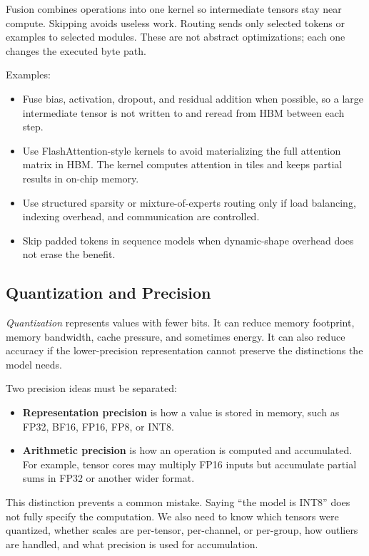 Fusion combines operations into one kernel so intermediate tensors stay near compute. Skipping avoids useless work. Routing sends only selected tokens or examples to selected modules. These are not abstract optimizations; each one changes the executed byte path.

Examples:

\begin{itemize}[leftmargin=*]
  \item Fuse bias, activation, dropout, and residual addition when possible, so a large intermediate tensor is not written to and reread from HBM between each step.
  \item Use FlashAttention-style kernels to avoid materializing the full attention matrix in HBM. The kernel computes attention in tiles and keeps partial results in on-chip memory.
  \item Use structured sparsity or mixture-of-experts routing only if load balancing, indexing overhead, and communication are controlled.
  \item Skip padded tokens in sequence models when dynamic-shape overhead does not erase the benefit.
\end{itemize}

\subsection{Quantization and Precision}

\emph{Quantization} represents values with fewer bits. It can reduce memory footprint, memory bandwidth, cache pressure, and sometimes energy. It can also reduce accuracy if the lower-precision representation cannot preserve the distinctions the model needs.

Two precision ideas must be separated:

\begin{itemize}[leftmargin=*]
  \item \textbf{Representation precision} is how a value is stored in memory, such as FP32, BF16, FP16, FP8, or INT8.
  \item \textbf{Arithmetic precision} is how an operation is computed and accumulated. For example, tensor cores may multiply FP16 inputs but accumulate partial sums in FP32 or another wider format.
\end{itemize}

This distinction prevents a common mistake. Saying ``the model is INT8'' does not fully specify the computation. We also need to know which tensors were quantized, whether scales are per-tensor, per-channel, or per-group, how outliers are handled, and what precision is used for accumulation.

